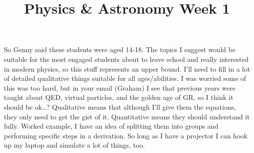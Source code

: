 \documentclass{article}
\begin{document}
\title{Physics \& Astronomy Week 1}
\date{}
\maketitle
So Genny said these students were aged 14-18. The topics I suggest would be suitable for the most engaged students about to leave school and really interested in modern physics, so this stuff represents an upper bound. I'll need to fill in a lot of detailed qualitative things suitable for all ages/abilities. I was worried some of this was too hard, but in your email (Graham) I see that previous years were taught about QED, virtual particles, and the golden age of GR, so I think it should be ok\ldots? Qualitative means that although I'll give them the equations, they only need to get the gist of it. Quantitative means they should understand it fully. Worked example, I have an idea of splitting them into groups and performing specific steps in a derivation. So long as I have a projector I can hook up my laptop and simulate a lot of things, too.
\end{document}
